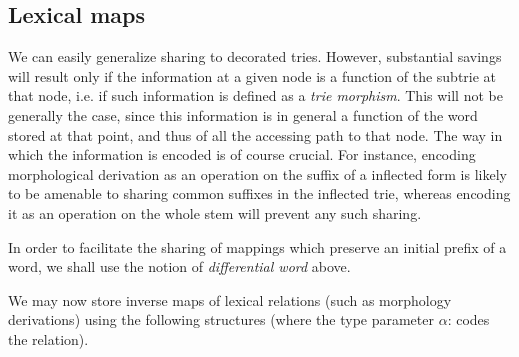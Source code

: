 \subsection{Lexical maps}

We can easily generalize sharing to decorated tries. However,
substantial savings will result only if the information at a given node
is a function of the subtrie at that node, i.e. if such information is
defined as a {\sl trie morphism}. This will not be generally the case,
since this information is in general a function of the word stored at
that point, and thus of all the accessing path to that node. The way in which
the information is encoded is of course crucial. For instance, encoding
morphological derivation as an operation on the suffix of a inflected form
is likely to be amenable to sharing common suffixes in the inflected trie,
whereas encoding it as an operation on the whole stem will prevent any 
such sharing. 

In order to facilitate the sharing of mappings which preserve an initial
prefix of a word, we shall use the notion of {\sl differential word} above.

We may now store inverse maps of lexical relations (such as morphology
derivations) using the following structures 
(where the type parameter $\alpha$: codes the relation).

